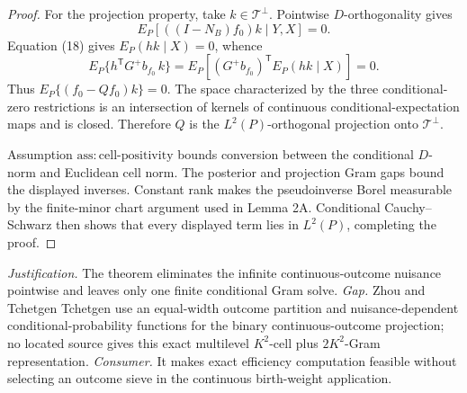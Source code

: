\documentclass{article}
\begin{document}
\begin{proof}
For the projection property, take \(k\in\mathcal T^\perp\).  Pointwise \(D\)-orthogonality gives
\[
 E_P[((I-N_B)f_0)k\mid Y,X]=0. \tag{21}
\]
Equation (18) gives \(E_P(hk\mid X)=0\), whence
\[
 E_P\{h^{\mathsf T}G^+b_{f_0}\,k\}
 =E_P[(G^+b_{f_0})^{\mathsf T}E_P(hk\mid X)]=0. \tag{22}
\]
Thus \(E_P\{(f_0-Qf_0)k\}=0\).  The space characterized by the three conditional-zero restrictions is an intersection of kernels of continuous conditional-expectation maps and is closed.  Therefore \(Q\) is the \(L^2(P)\)-orthogonal projection onto \(\mathcal T^\perp\).

Assumption \(\mathrm{ass{:}cell\mbox{-}positivity}\) bounds conversion between the conditional \(D\)-norm and Euclidean cell norm.  The posterior and projection Gram gaps bound the displayed inverses.  Constant rank makes the pseudoinverse Borel measurable by the finite-minor chart argument used in Lemma 2A.  Conditional Cauchy--Schwarz then shows that every displayed term lies in \(L^2(P)\), completing the proof.
\end{proof}
\par\smallskip\noindent \textit{Justification.} The theorem eliminates the infinite continuous-outcome nuisance pointwise and leaves only one finite conditional Gram solve. \textit{Gap.} Zhou and Tchetgen Tchetgen use an equal-width outcome partition and nuisance-dependent conditional-probability functions for the binary continuous-outcome projection; no located source gives this exact multilevel \(K^{2}\)-cell plus \(2K^{2}\)-Gram representation. \textit{Consumer.} It makes exact efficiency computation feasible without selecting an outcome sieve in the continuous birth-weight application.
\end{document}
